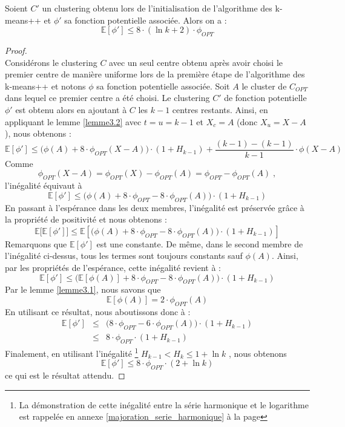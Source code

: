 \documentclass[12pt,a4paper]{book}
\newcommand{\E}{\mathbb{E}}
\newcommand{\1}{\mathds{1}}
\begin{document}
	\begin{theorem}\label{theoreme3.1}
		Soient $C'$ un clustering obtenu lors de l'initialisation de l'algorithme des k-means++ et $\phi'$ sa fonction potentielle associée.
		Alors on a :
		$$
			\E[\phi'] \leq 8 \cdot \left(\ln k + 2 \right) \cdot \phi_{OPT}
		$$ 
	\end{theorem}
	
	\begin{proof}
		~\\
		Considérons le clustering $C$ avec un seul centre obtenu après avoir choisi le premier centre de manière uniforme lors de la première étape de l'algorithme des k-means++ et notons $\phi$ sa fonction potentielle associée. Soit $A$ le cluster de $C_{OPT}$ dans lequel ce premier centre a été choisi. Le clustering $C'$ de fonction potentielle $\phi'$ est obtenu alors en ajoutant à $C$ les $k-1$ centres restants. Ainsi, en appliquant le lemme \ref{lemme3.2} avec  $t=u=k-1$ et $X_c=A$ (donc $X_u=X-A$), nous obtenons :
		$$
			\E[\phi'] \leq \bigg( \phi \left( A \right) + 8 \cdot \phi_{OPT} \left( X-A \right) \bigg) \cdot \left( 1 + H_{k-1} \right) + \frac{(k-1)-(k-1)}{k-1} \cdot \phi \left( X-A \right)
		$$
		Comme $$\phi_{OPT} \left( X-A \right) = \phi_{OPT} \left( X \right) - \phi_{OPT}\left( A \right) = \phi_{OPT} - \phi_{OPT}\left( A \right) \; ,$$ l'inégalité équivaut à
		$$
			\E[\phi'] \leq \bigg( \phi \left( A \right) + 8 \cdot \phi_{OPT} - 8 \cdot \phi_{OPT} \left( A \right) \bigg) \cdot \left( 1 + H_{k-1} \right)
		$$
		En passant à l'espérance dans les deux membres, l'inégalité est préservée grâce à la propriété de positivité et nous obtenons :
		$$
			\E\bigg[\E[\phi']\bigg] \leq \E \left[\bigg( \phi \left( A \right) + 8 \cdot \phi_{OPT} - 8 \cdot \phi_{OPT} \left( A \right) \bigg) \cdot \left( 1 + H_{k-1} \right)\right]
		$$
		Remarquons que $\E[\phi']$ est une constante. De même, dans le second membre de l'inégalité ci-dessus, tous les termes sont toujours constants sauf $\phi(A)$. Ainsi, par les propriétés de l'espérance, cette inégalité revient à :
		$$
			\E[\phi'] \leq \bigg( \E\left[ \phi \left( A \right)\right] + 8 \cdot \phi_{OPT} - 8 \cdot \phi_{OPT} \left( A \right) \bigg) \cdot \left( 1 + H_{k-1} \right)
		$$
		Par le lemme \ref{lemme3.1}, nous savons que
		$$
			\E\left[\phi(A)\right] = 2 \cdot \phi_{OPT} \left( A \right)
		$$
		 En utilisant ce résultat, nous aboutissons donc à :
		 \begin{eqnarray*}
		 	\E[\phi'] &\leq & \bigg(8 \cdot \phi_{OPT} - 6 \cdot \phi_{OPT} \left( A \right) \bigg) \cdot \left( 1 + H_{k-1} \right) \\
		 	& \leq & 8 \cdot \phi_{OPT}\cdot \left( 1 + H_{k-1} \right)
		 \end{eqnarray*}
		 Finalement, en utilisant l'inégalité \footnote{La démonstration de cette inégalité entre la série harmonique et le logarithme est rappelée en annexe \ref{majoration_serie_harmonique} à la page \pageref{majoration_serie_harmonique}} $H_{k-1} < H_k \leq 1 + \ln k$ , nous obtenons 
		 $$
		 	\E[\phi'] \leq  8 \cdot \phi_{OPT}\cdot \left( 2 + \ln k \right)
		 $$
		 ce qui est le résultat attendu.
	\end{proof}
\end{document}
